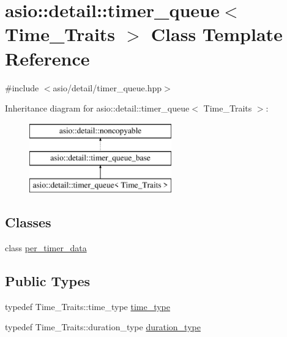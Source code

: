 \hypertarget{classasio_1_1detail_1_1timer__queue}{}\section{asio\+:\+:detail\+:\+:timer\+\_\+queue$<$ Time\+\_\+\+Traits $>$ Class Template Reference}
\label{classasio_1_1detail_1_1timer__queue}


{\ttfamily \#include $<$asio/detail/timer\+\_\+queue.\+hpp$>$}

Inheritance diagram for asio\+:\+:detail\+:\+:timer\+\_\+queue$<$ Time\+\_\+\+Traits $>$\+:\begin{figure}[H]
\begin{center}
\leavevmode
\includegraphics[height=3.000000cm]{classasio_1_1detail_1_1timer__queue}
\end{center}
\end{figure}
\subsection*{Classes}
\begin{DoxyCompactItemize}
\item 
class \hyperlink{classasio_1_1detail_1_1timer__queue_1_1per__timer__data}{per\+\_\+timer\+\_\+data}
\end{DoxyCompactItemize}
\subsection*{Public Types}
\begin{DoxyCompactItemize}
\item 
typedef Time\+\_\+\+Traits\+::time\+\_\+type \hyperlink{classasio_1_1detail_1_1timer__queue_aed8a9658d61debbeb8d201f4dc74e139}{time\+\_\+type}
\item 
typedef Time\+\_\+\+Traits\+::duration\+\_\+type \hyperlink{classasio_1_1detail_1_1timer__queue_af8b576763396e5af620c640e253f4f54}{duration\+\_\+type}
\end{DoxyCompactItemize}
